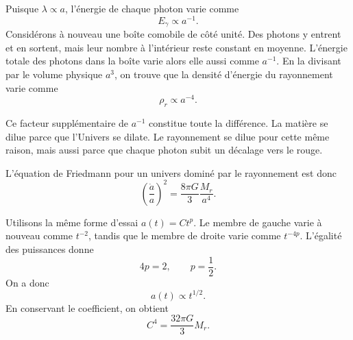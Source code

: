 Puisque \(\lambda\propto a\), l’énergie de chaque photon varie comme
\begin{equation}
E_\gamma\propto a^{-1}.
\end{equation}
Considérons à nouveau une boîte comobile de côté unité. Des photons y entrent et en sortent, mais leur nombre à l’intérieur reste constant en moyenne. L’énergie totale des photons dans la boîte varie alors elle aussi comme \(a^{-1}\). En la divisant par le volume physique \(a^3\), on trouve que la densité d’énergie du rayonnement varie comme
\begin{equation}
\rho_r\propto a^{-4}.
\end{equation}

Ce facteur supplémentaire de \(a^{-1}\) constitue toute la différence. La matière se dilue parce que l’Univers se dilate. Le rayonnement se dilue pour cette même raison, mais aussi parce que chaque photon subit un décalage vers le rouge.

L’équation de Friedmann pour un univers dominé par le rayonnement est donc
\begin{equation}
\left(\frac{\dot a}{a}\right)^2=\frac{8\pi G}{3}\frac{M_r}{a^4}.
\end{equation}

Utilisons la même forme d’essai \(a(t)=Ct^p\). Le membre de gauche varie à nouveau comme \(t^{-2}\), tandis que le membre de droite varie comme \(t^{-4p}\). L’égalité des puissances donne
\begin{equation}
4p=2,
\qquad
p=\frac{1}{2}.
\end{equation}
On a donc
\begin{equation}
a(t)\propto t^{1/2}.
\end{equation}
En conservant le coefficient, on obtient
\begin{equation}
C^4=\frac{32\pi G}{3}M_r.
\end{equation}

\begin{classroomqa}
\end{classroomqa}

